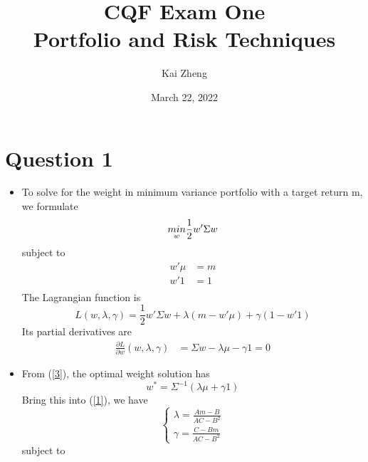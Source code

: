 \documentclass[UTF8]{ctexart}
\title{\vspace{-1cm}CQF Exam One\\Portfolio and Risk Techniques}
\author{Kai Zheng}
\date{March 22, 2022}
\begin{document}
\maketitle

\section*{Question 1}
\begin{itemize}
	\item To solve for the weight in minimum variance portfolio with a target return m, we formulate
	      \begin{equation}\notag
		      \underset{w}{min}\frac{1}{2}w'\Sigma w
	      \end{equation}
	      subject to
	      \begin{equation}\label{1}
		      \begin{aligned}
			      w'\mu & = m \\
			      w'1   & = 1 \\
		      \end{aligned}
	      \end{equation}
	      The Lagrangian function is
	      \begin{equation}\label{2}
		      L(w,\lambda,\gamma) = \frac{1}{2}w'\Sigma w + \lambda(m-w'\mu) + \gamma(1-w'1)
	      \end{equation}
	      Its partial derivatives are
	      \begin{equation}\label{3}
		      \begin{aligned}
			      \frac{\partial L}{\partial w}(w,\lambda,\gamma) & = \Sigma w - \lambda \mu - \gamma1= 0
		      \end{aligned}
	      \end{equation}
	\item From (\ref{3}), the optimal weight solution has
	      \begin{equation}\label{4}
		      w^* = \Sigma^{-1}(\lambda\mu + \gamma 1)
	      \end{equation}
	      Bring this into (\ref{1}), we have
	      \begin{equation}\label{5}
		      \begin{cases}
			      \lambda = \frac{Am-B}{AC-B^2} \\
			      \gamma = \frac{C-Bm}{AC-B^2}
		      \end{cases}
	      \end{equation}
	      subject to
	      \begin{equation}\label{6}

\end{equation}
\end{itemize}
\end{document}
